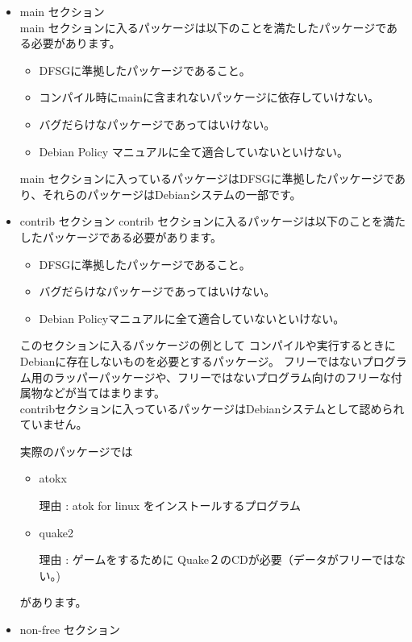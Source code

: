 \documentclass[mingoth,a4paper]{jsarticle}
\begin{document}
\begin{itemize}
 \item main セクション
\\
	main セクションに入るパッケージは以下のことを満たしたパッケージである必要があります。

	\begin{itemize}
	 \item DFSGに準拠したパッケージであること。
	 \item コンパイル時にmainに含まれないパッケージに依存していけない。
	 \item バグだらけなパッケージであってはいけない。
	 \item Debian Policy マニュアルに全て適合していないといけない。
	\end{itemize}


	main セクションに入っているパッケージはDFSGに準拠したパッケージであり、それらのパッケージはDebianシステムの一部です。
	
 \item contrib セクション
	contrib セクションに入るパッケージは以下のことを満たしたパッケージである必要があります。
\\
	\begin{itemize}
	 \item DFSGに準拠したパッケージであること。
	 \item バグだらけなパッケージであってはいけない。
	 \item Debian Policyマニュアルに全て適合していないといけない。
	\end{itemize}


	このセクションに入るパッケージの例として
	コンパイルや実行するときにDebianに存在しないものを必要とするパッケージ。
	フリーではないプログラム用のラッパーパッケージや、フリーではないプログラム向けのフリーな付属物などが当てはまります。
\\
	
	contribセクションに入っているパッケージはDebianシステムとして認められていません。

	実際のパッケージでは
	\begin{itemize}
 	\item atokx 
 
 	理由 : atok for linux をインストールするプログラム
 	\item quake2
 
 	理由 : ゲームをするために Quake２のCDが必要（データがフリーではない。)
	\end{itemize}
	があります。
		
 \item non-free セクション
 

\end{itemize}
\end{document}
